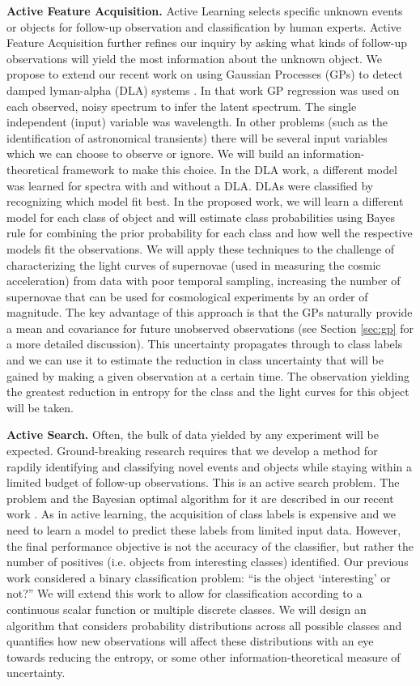 \documentclass[useAMS,usenatbib,tightenlines,11pt,preprint]{aastex}
\begin{document}
{\bf Active Feature Acquisition.}  Active Learning selects specific
unknown events or objects for follow-up observation and classification
by human experts.  Active Feature Acquisition further refines our
inquiry by asking what kinds of follow-up observations will yield the
most information about the unknown object.  We propose to extend our
recent work on using Gaussian Processes (GPs) to detect damped
lyman-alpha (DLA) systems \cite{Garnett12a}.  In that work GP
regression was used on each observed, noisy spectrum to infer the
latent spectrum.  The single independent (input) variable was
wavelength.  In other problems (such as the identification of
astronomical transients) there will be several input variables which
we can choose to observe or ignore.  
We will build an information-theoretical framework to make this choice.
In the DLA work, a different
model was learned for spectra with and without a DLA.  DLAs were
classified by recognizing which model fit best.  In the proposed work,
we will learn a different model for each class of object and will
estimate class probabilities using Bayes rule for combining the prior
probability for each class and how well the respective models fit the
observations.  We will apply these techniques to the challenge of
characterizing the light curves of supernovae (used in measuring the
cosmic acceleration) from data with poor temporal sampling,
increasing the number of supernovae that can be used for cosmological
experiments by an order of magnitude.  The key advantage of this
approach is that the GPs naturally provide a mean and covariance for
future unobserved observations (see Section \ref{sec:gp} for a more detailed
discussion).  This uncertainty propagates through
to class labels and we can use it to estimate the reduction in class
uncertainty that will be gained by making a given observation at a
certain time.  The observation yielding the greatest reduction in
entropy for the class and the light curves for this object will be
taken.

{\bf Active Search.}  Often, the bulk of data yielded by any experiment will be
expected.  Ground-breaking research requires that we develop a method for
rapdily identifying and classifying novel events and objects
while staying within a limited
budget of follow-up observations.  This is an active search problem. The
problem and the Bayesian optimal algorithm for it are described in our
recent work \cite{Garnett11,Garnett12}.  As in active learning, the
acquisition of class labels is expensive and we need to learn a model to
predict these labels from limited input data.  However, the final
performance objective is not the accuracy of the classifier, but rather the
number of positives (i.e. objects from interesting classes)
identified. Our previous work considered a binary classification problem: ``is
the object `interesting' or not?''  We will extend this work to allow for
classification according to a continuous scalar function or multiple discrete
classes.  We will design an algorithm that considers probability distributions
across all possible classes and
quantifies how new observations will affect these
distributions with an eye towards reducing the entropy, or some other
information-theoretical measure of uncertainty.
\end{document}
